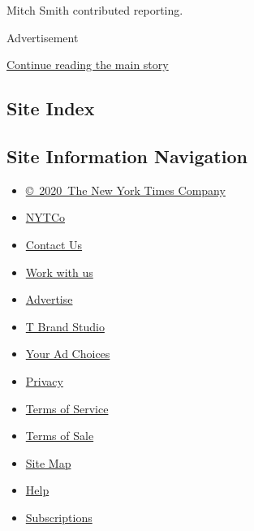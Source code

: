 Mitch Smith contributed reporting.

Advertisement

\protect\hyperlink{after-bottom}{Continue reading the main story}

\hypertarget{site-index}{%
\subsection{Site Index}\label{site-index}}

\hypertarget{site-information-navigation}{%
\subsection{Site Information
Navigation}\label{site-information-navigation}}

\begin{itemize}
\tightlist
\item
  \href{https://help.nytimes3xbfgragh.onion/hc/en-us/articles/115014792127-Copyright-notice}{©~2020~The
  New York Times Company}
\end{itemize}

\begin{itemize}
\tightlist
\item
  \href{https://www.nytco.com/}{NYTCo}
\item
  \href{https://help.nytimes3xbfgragh.onion/hc/en-us/articles/115015385887-Contact-Us}{Contact
  Us}
\item
  \href{https://www.nytco.com/careers/}{Work with us}
\item
  \href{https://nytmediakit.com/}{Advertise}
\item
  \href{http://www.tbrandstudio.com/}{T Brand Studio}
\item
  \href{https://www.nytimes3xbfgragh.onion/privacy/cookie-policy\#how-do-i-manage-trackers}{Your
  Ad Choices}
\item
  \href{https://www.nytimes3xbfgragh.onion/privacy}{Privacy}
\item
  \href{https://help.nytimes3xbfgragh.onion/hc/en-us/articles/115014893428-Terms-of-service}{Terms
  of Service}
\item
  \href{https://help.nytimes3xbfgragh.onion/hc/en-us/articles/115014893968-Terms-of-sale}{Terms
  of Sale}
\item
  \href{https://spiderbites.nytimes3xbfgragh.onion}{Site Map}
\item
  \href{https://help.nytimes3xbfgragh.onion/hc/en-us}{Help}
\item
  \href{https://www.nytimes3xbfgragh.onion/subscription?campaignId=37WXW}{Subscriptions}
\end{itemize}
